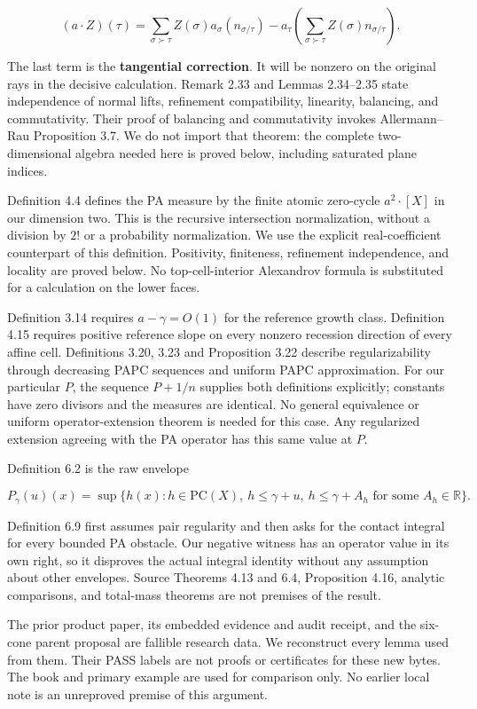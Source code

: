 \documentclass[
  10pt,
]{article}
\begin{document}
\[
(a\cdot Z)(\tau)=
\sum_{\sigma\succ\tau} Z(\sigma)a_\sigma(n_{\sigma/\tau})
-a_\tau\left(\sum_{\sigma\succ\tau}Z(\sigma)n_{\sigma/\tau}\right).
\tag{D}
\]

The last term is the \textbf{tangential correction}. It will be nonzero
on the original rays in the decisive calculation. Remark 2.33 and Lemmas
2.34--2.35 state independence of normal lifts, refinement compatibility,
linearity, balancing, and commutativity. Their proof of balancing and
commutativity invokes Allermann--Rau Proposition 3.7. We do not import
that theorem: the complete two-dimensional algebra needed here is proved
below, including saturated plane indices.

Definition 4.4 defines the PA measure by the finite atomic zero-cycle
\(a^2\cdot[X]\) in our dimension two. This is the recursive intersection
normalization, without a division by \(2!\) or a probability
normalization. We use the explicit real-coefficient counterpart of this
definition. Positivity, finiteness, refinement independence, and
locality are proved below. No top-cell-interior Alexandrov formula is
substituted for a calculation on the lower faces.

Definition 3.14 requires \(a-\gamma=O(1)\) for the reference growth
class. Definition 4.15 requires positive reference slope on every
nonzero recession direction of every affine cell. Definitions 3.20, 3.23
and Proposition 3.22 describe regularizability through decreasing PAPC
sequences and uniform PAPC approximation. For our particular \(P\), the
sequence \(P+1/n\) supplies both definitions explicitly; constants have
zero divisors and the measures are identical. No general equivalence or
uniform operator-extension theorem is needed for this case. Any
regularized extension agreeing with the PA operator has this same value
at \(P\).

Definition 6.2 is the raw envelope

\[
P_\gamma(u)(x)=\sup\{h(x):h\in\mathrm{PC}(X),\ h\leq\gamma+u,
\ h\leq\gamma+A_h\text{ for some }A_h\in\mathbb R\}. \tag{E}
\]

Definition 6.9 first assumes pair regularity and then asks for the
contact integral for every bounded PA obstacle. Our negative witness has
an operator value in its own right, so it disproves the actual integral
identity without any assumption about other envelopes. Source Theorems
4.13 and 6.4, Proposition 4.16, analytic comparisons, and total-mass
theorems are not premises of the result.

The prior product paper, its embedded evidence and audit receipt, and
the six-cone parent proposal are fallible research data. We reconstruct
every lemma used from them. Their PASS labels are not proofs or
certificates for these new bytes. The book and primary example are used
for comparison only. No earlier local note is an unreproved premise of
this argument.
\end{document}
